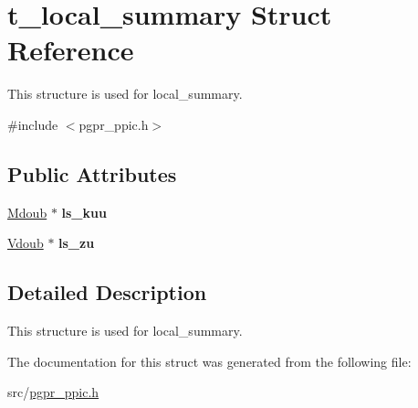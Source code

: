 \hypertarget{structt__local__summary}{\section{t\+\_\+local\+\_\+summary Struct Reference}
\label{structt__local__summary}
}


This structure is used for local\+\_\+summary.  




{\ttfamily \#include $<$pgpr\+\_\+ppic.\+h$>$}

\subsection*{Public Attributes}
\begin{DoxyCompactItemize}
\item 
\hypertarget{structt__local__summary_a1318913867d7317489969f83621411bd}{\hyperlink{classpgpr__matrix}{Mdoub} $\ast$ {\bfseries ls\+\_\+kuu}}\label{structt__local__summary_a1318913867d7317489969f83621411bd}

\item 
\hypertarget{structt__local__summary_a7d397256f86a2c4be8598492b1e2d296}{\hyperlink{classpgpr__vector}{Vdoub} $\ast$ {\bfseries ls\+\_\+zu}}\label{structt__local__summary_a7d397256f86a2c4be8598492b1e2d296}

\end{DoxyCompactItemize}


\subsection{Detailed Description}
This structure is used for local\+\_\+summary. 

The documentation for this struct was generated from the following file\+:\begin{DoxyCompactItemize}
\item 
src/\hyperlink{pgpr__ppic_8h}{pgpr\+\_\+ppic.\+h}\end{DoxyCompactItemize}
